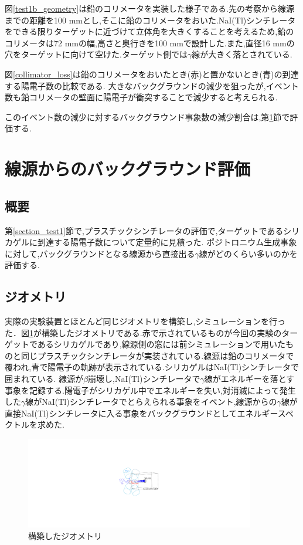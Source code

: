 図\ref{test1b_geometry}は鉛のコリメータを実装した様子である.先の考察から線源までの距離を100 mmとし,そこに鉛のコリメータをおいた.NaI(Tl)シンチレータをできる限りターゲットに近づけて立体角を大きくすることを考えるため,鉛のコリメータは72 mmの幅,高さと奥行きを100 mmで設計した.また,直径16 mmの穴をターゲットに向けて空けた.ターゲット側では$\gamma$線が大きく落とされている.

図\ref{collimator_loss}は鉛のコリメータをおいたとき(赤)と置かないとき(青)の到達する陽電子数の比較である.
大きなバックグラウンドの減少を狙ったが,イベント数も鉛コリメータの壁面に陽電子が衝突することで減少すると考えられる.

このイベント数の減少に対するバックグラウンド事象数の減少割合は,第\ref{section_test2}節で評価する.

\section{線源からのバックグラウンド評価}
\label{section_test2}

\subsection{概要}
第\ref{section_test1}節で,プラスチックシンチレータの評価で,ターゲットであるシリカゲルに到達する陽電子数について定量的に見積った.
ポジトロニウム生成事象に対して,バックグラウンドとなる線源から直接出る$\gamma$線がどのくらい多いのかを評価する.


\subsection{ジオメトリ}
実際の実験装置とほとんど同じジオメトリを構築し,シミュレーションを行った．図\ref{test2_geometry}が構築したジオメトリである.赤で示されているものが今回の実験のターゲットであるシリカゲルであり,線源側の窓には前シミュレーションで用いたものと同じプラスチックシンチレータが実装されている.線源は鉛のコリメータで覆われ,青で陽電子の軌跡が表示されている.シリカゲルはNaI(Tl)シンチレータで囲まれている.
線源が$\beta$崩壊し,NaI(Tl)シンチレータで$\gamma$線がエネルギーを落とす事象を記録する.陽電子がシリカゲル中でエネルギーを失い,対消滅によって発生した$\gamma$線がNaI(Tl)シンチレータでとらえられる事象をイベント,線源からの$\gamma$線が直接NaI(Tl)シンチレータに入る事象をバックグラウンドとしてエネルギースペクトルを求めた.

\begin{figure}[htbp]
	\centering
		\includegraphics[width=10cm]{img/test2_geometry.pdf}
	\caption{構築したジオメトリ}
	\label{test2_geometry}
\end{figure}

